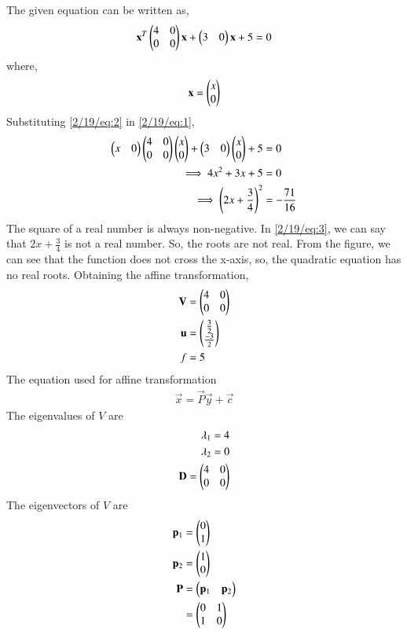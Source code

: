 The given equation can be written as,
\begin{align}
    \mathbf{x}^T\begin{pmatrix}4 & 0 \\ 0 & 0\end{pmatrix}\mathbf{x} + \begin{pmatrix}3 & 0\end{pmatrix}\mathbf{x} + 5 = 0 \label{2/19/eq:1}
\end{align}
where,
\begin{align}
    \mathbf{x} = \begin{pmatrix}x \\ 0\end{pmatrix} \label{2/19/eq:2}
\end{align}
Substituting \eqref{2/19/eq:2} in \eqref{2/19/eq:1},
\begin{align}
    \begin{pmatrix}x & 0\end{pmatrix}\begin{pmatrix}4 & 0 \\ 0 & 0\end{pmatrix}\begin{pmatrix}x \\ 0\end{pmatrix} + \begin{pmatrix}3 & 0\end{pmatrix}\begin{pmatrix}x \\ 0\end{pmatrix} + 5 &= 0 \\
    \implies 4x^2 + 3x + 5 &= 0\\
    \implies \left(2x + \frac{3}{4}\right)^2 &= -\frac{71}{16}\label{2/19/eq:3}
\end{align}
The square of a real number is always non-negative. In \eqref{2/19/eq:3}, we can say that $2x + \frac{3}{4}$ is not a real number. So, the roots are not real. From the figure, we can see that the function does not cross the x-axis, so, the quadratic equation has no real roots. Obtaining the affine transformation,
\begin{align}
    \mathbf{V} &= \begin{pmatrix}4 & 0 \\ 0 & 0\end{pmatrix}\\
    \mathbf{u} &= \begin{pmatrix}\frac{3}{2}\\\frac{-3}{2}\end{pmatrix}\\
    f &= 5
\end{align}
The equation used for affine transformation
\begin{align}
    \vec{x} = \vec{P}\vec{y} + \vec{c}
\end{align}
The eigenvalues of $V$ are
\begin{align}
    \lambda_1 = 4\\
    \lambda_2 = 0\\
    \mathbf{D} = \begin{pmatrix}4 & 0\\0 & 0\end{pmatrix}
\end{align}
The eigenvectors of $V$ are
\begin{align}
    \mathbf{p}_1 &= \begin{pmatrix}0 \\ 1\end{pmatrix}\\
    \mathbf{p}_2 &= \begin{pmatrix}1 \\ 0\end{pmatrix}\\
    \mathbf{P} &= \begin{pmatrix}\mathbf{p}_1 & \mathbf{p}_2\end{pmatrix}\\
    &= \begin{pmatrix}0 & 1 \\ 1 & 0\end{pmatrix}
\end{align}
